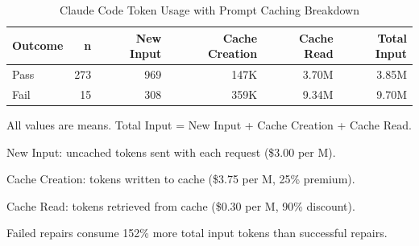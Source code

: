 \begin{table}[t]
\centering
\caption{Claude Code Token Usage with Prompt Caching Breakdown}
\label{tab:claude-token-usage}
\begin{tabular}{@{}lrrrrr@{}}
\toprule
\textbf{Outcome} & \textbf{n} & \textbf{New Input} & \textbf{Cache Creation} & \textbf{Cache Read} & \textbf{Total Input} \\
\midrule
Pass & 273 & 969 & 147K & 3.70M & 3.85M \\
Fail & 15  & 308 & 359K & 9.34M & 9.70M \\
\bottomrule
\end{tabular}
\begin{tablenotes}
\small
\item All values are means. Total Input = New Input + Cache Creation + Cache Read.
\item New Input: uncached tokens sent with each request (\$3.00 per M).
\item Cache Creation: tokens written to cache (\$3.75 per M, 25\% premium).
\item Cache Read: tokens retrieved from cache (\$0.30 per M, 90\% discount).
\item Failed repairs consume 152\% more total input tokens than successful repairs.
\end{tablenotes}
\end{table}
